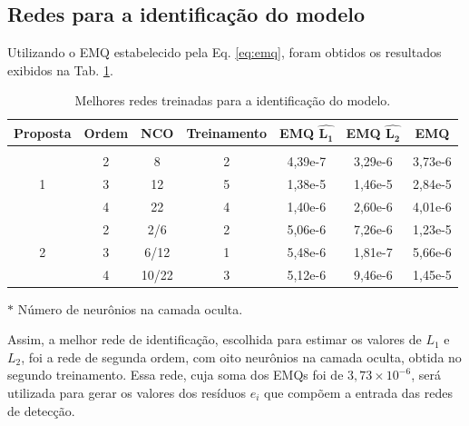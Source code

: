 \subsection{Redes para a identificação do modelo}
Utilizando o EMQ estabelecido pela Eq. \ref{eq:emq}, foram obtidos os resultados
exibidos na Tab. \ref{tab:melhores_rnas_ident}.

\begin{table}[htb]
\small
\centering
\caption{Melhores redes treinadas para a identificação do modelo.}
\label{tab:melhores_rnas_ident}
\vspace{0.25cm}
\begin{threeparttable}
\begin{tabular}{|c|c|c|c|c|c|c|}
\hline
{\bf Proposta} & 
{\bf Ordem} & 
{\bf NCO\tnote{$*$}} & 
{\bf Treinamento} &
{\bf EMQ $\mathbf{\widehat{L_1}}$} & 
{\bf EMQ $\mathbf{\widehat{L_2}}$} & 
{\bf EMQ}\\
\hline
\hhline\\
\multirow{3}{*}{1} &
\cellcolor[gray]{0.85}2 &
\cellcolor[gray]{0.85}8 &
\cellcolor[gray]{0.85}2 &
\cellcolor[gray]{0.85}4,39e-7 &
\cellcolor[gray]{0.85}3,29e-6 &
\cellcolor[gray]{0.85}3,73e-6\\
\hhline{~------}
&3 & 12 & 5 & 1,38e-5 & 1,46e-5 & 2,84e-5\\
\cline{2-7}
&4 & 22 & 4 & 1,40e-6 & 2,60e-6 & 4,01e-6\\
\hline
\multirow{3}{*}{2} & 2 & 2/6 & 2 & 5,06e-6 & 7,26e-6 & 1,23e-5\\
\cline{2-7}
& 3 & 6/12 & 1 & 5,48e-6 & 1,81e-7 & 5,66e-6\\
\cline{2-7}
& 4 & 10/22 & 3 & 5,12e-6 & 9,46e-6 & 1,45e-5\\
\hline
\end{tabular}
\begin{tablenotes}
\item [$*$] Número de neurônios na camada oculta.
\end{tablenotes}
\end{threeparttable}
\end{table}

Assim, a melhor rede de identificação, escolhida para estimar os valores de
$L_1$ e $L_2$, foi a rede de segunda ordem, com oito neurônios na camada oculta,
obtida no segundo treinamento. Essa rede, cuja soma dos EMQs foi de $3,73 \times
10^{-6}$, será utilizada para gerar os valores dos resíduos $e_i$
que compõem a entrada das redes de detecção.

